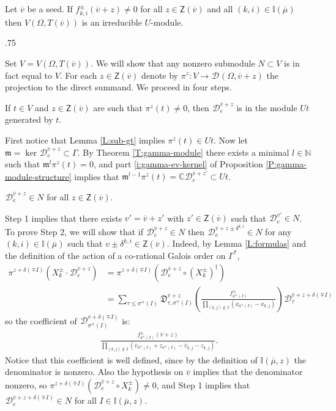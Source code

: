 \documentclass[11pt,fleqn]{amsart}
\makeatletter
\renewcommand\proofname{Proof}
\renewenvironment{proof}[1][\textit{\proofname}]{\par
 \pushQED{\qed}%
 \normalfont \topsep.75\paraskip\relax
 \trivlist
 \item[\hskip\labelsep
 \itshape
 #1\@addpunct{.}]\ignorespaces
}{%
 \popQED\endtrivlist\@endpefalse
}
\newcounter{para}[section]
\newcommand\NN{\mathbb N}
\newcommand\CC{\mathbb C}
\newcommand\II{\mathbb I}
\renewcommand\to{\longrightarrow}
\newcommand\D[3]{{}^{#1} \mathfrak D_{#2}^{#3}}
\newcommand\DD[3]{{}^{#1} \mathcal D_{#2}^{#3}}
\newcommand\Z{\mathsf Z}
\newcommand\m{\mathfrak m}
\newcommand\vv{\overline{v}}
\makeatother
\begin{document}
\begin{Theorem}
\label{T:simplicity}
Let $\vv$ be a seed. If $f_{k,i}^{\pm}(\vv + z) \neq 0$ for all $z \in \Z(\vv)$ and 
all $(k,i) \in \II(\overline \mu)$ then $V(\Omega, T(\vv))$ is an 
irreducible $U$-module.
\end{Theorem}
\begin{proof}
Set $V = V(\Omega, T(\vv))$. We will show that any nonzero submodule $N 
\subset V$ is in fact equal to $V$. For each $z \in \Z(\vv)$ denote by $\pi^z: V \to \DD{}{}{} (\Omega, \vv + z)$ 
the projection to the direct summand. 
We proceed in four steps.

 If $t \in V$ and  $z \in \Z(\vv)$ are such that $\pi^z(t) \neq 0$, then 
$\DD{}{e}{\vv +z}$ is in the module $ U t$ generated by $t$. 

First notice that Lemma \ref{L:sub-gt} implies $\pi^{z}(t) 
\in U t$. Now let $\m = \ker \DD{}{e}{\vv+z} \subset \Gamma$. By Theorem 
\ref{T:gamma-module} there exists a minimal $l \in \NN$ such that $\m^l 
\pi^{z}(t) = 0$, and part \ref{i:gamma-ev-kernel} of Proposition 
\ref{P:gamma-module-structure} implies that $\m^{l-1} \pi^{z}(t) = \CC 
\DD{}{e}{\vv+z'} \subset U t$. 

$\DD{}{e}{\vv + z} \in N$ for all $z \in \Z(\vv)$.

Step 1 implies that there exists $v' = \vv + z'$ with $z' \in \Z(\vv)$ such 
that $\DD{}{e}{v'} \in N$. To prove Step 2,  we will show that if 
$\DD{}{e}{\vv + z} \in N$ then $\DD{}{e}{\vv + z \pm \delta^{k,i}} \in N$ for 
any $(k,i) \in \II(\overline \mu)$ such that $v\pm \delta^{k,i} \in \Z(\vv)$. 
Indeed, by Lemma \ref{L:formulas} and the definition of the action of a 
co-rational Galois order on $\Gamma^*$,
\begin{align*}
\pi^{z + \delta(\mp I)} \left(X_k^\pm \cdot\DD{}{e}{\vv + z} \right)
	&= \pi^{z + \delta(\mp I)} \left(
		\DD{}{e}{\vv + z} \circ (X_k^\pm)^\dagger 
	\right) \\
 	&= \sum_{\tau \leq \sigma^\mp(I)} \D{}{\tau, \sigma^\mp(I)}{\vv + z} 
 		\left( 
 			\frac{f_{a^\mp(I)}^\pm}{\displaystyle \prod_{(k,j) \notin I} 
 				(x_{a^\mp(I)} - x_{k,j})} 
 		\right) \DD{}{\tau}{\vv + z + \delta(\mp I)}
\end{align*}
so the coefficient of $\DD{}{\sigma^\mp(I)}{\vv + \delta(\mp I)}$ is: 
\begin{align*}
\frac{f_{a^\mp(I)}^\pm(\vv + z)}{\displaystyle
	\prod_{(k,j) \notin I} (\vv_{a^\mp(I)} + z_{a^\mp(I)} - \vv_{k,j} - z_{k,j})}.
\end{align*}
Notice that this coefficient  is well defined, since by the definition of $\II(\overline 
\mu, z)$ the denominator is nonzero. Also the hypothesis on $\vv$ implies that  the 
denominator nonzero, so $\pi^{z + \delta(\mp I)} (\DD{}{e}{\vv + z} \circ 
X^\pm_k) \neq 0$, and Step 1 implies that $\DD{}{e}{\vv + z + \delta(\mp I)} 
\in N$ for all $I \in \II(\overline \mu, z)$.


\end{proof}
\end{document}
